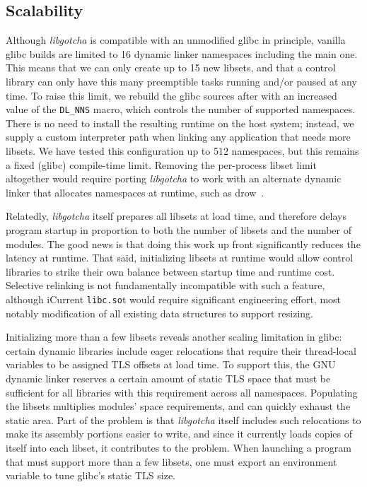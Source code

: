 \subsection{Scalability}

Although \textit{libgotcha} is compatible with an unmodified glibc in principle,
vanilla glibc builds are limited to 16 dynamic linker namespaces including the main
one.  This means that we can only create up to 15 new libsets, and that a control
library can only have this many preemptible tasks running and/or paused at any time.
To raise this limit, we rebuild the glibc sources after with an increased value of
the \texttt{DL\_NNS} macro, which controls the number of supported namespaces.  There
is no need to install the resulting runtime on the host system; instead, we supply a
custom interpreter path when linking any application that needs more libsets.  We
have tested this configuration up to 512 namespaces, but this remains a fixed (glibc)
compile-time limit.  Removing the per-process libset limit altogether would require
porting \textit{libgotcha} to work with an alternate dynamic linker that allocates
namespaces at runtime, such as drow~\cite{www-drow-loader}.

Relatedly, \textit{libgotcha} itself prepares all libsets at load time, and therefore
delays program startup in proportion to both the number of libsets and the number of
modules.  The good news is that doing this work up front significantly reduces the
latency at runtime.  That said, initializing libsets at runtime would allow control
libraries to strike their own balance between startup time and runtime cost.
Selective relinking is not fundamentally incompatible with such a feature, although
iCurrent \texttt{libc.so}t would require significant engineering effort, most notably modification of all
existing data structures to support resizing.

Initializing more than a few libsets reveals another scaling limitation in glibc:\@
certain dynamic libraries include eager relocations that require their thread-local
variables to be assigned TLS offsets at load time.  To support this, the GNU dynamic
linker reserves a certain amount of static TLS space that must be sufficient for all
libraries with this requirement across all namespaces.  Populating the libsets
multiplies modules' space requirements, and can quickly exhaust the static area.
Part of the problem is that \textit{libgotcha} itself includes such relocations to
make its assembly portions easier to write, and since it currently loads copies of
itself into each libset, it contributes to the problem.  When launching a program
that must support more than a few libsets, one must export an environment variable
to tune glibc's static TLS size.



